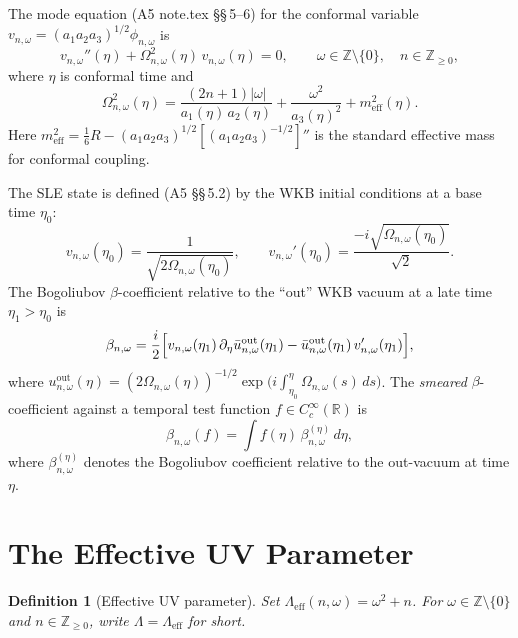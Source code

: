 \documentclass[11pt, a4paper]{article}
\newtheorem{definition}[theorem]{Definition}
\newcommand{\RR}{\mathbb{R}}
\newcommand{\ZZ}{\mathbb{Z}}
\newcommand{\om}{\omega}
\newcommand{\sixth}{\tfrac{1}{6}}
\newcommand{\Lam}{\Lambda}
\begin{document}
The mode equation (A5 note.tex \S\S\,5--6) for the conformal variable
$v_{n,\om} = (a_1 a_2 a_3)^{1/2} \phi_{n,\om}$ is
\begin{equation}\label{eq:mode}
  v_{n,\om}''(\eta) + \Omega_{n,\om}^2(\eta)\,v_{n,\om}(\eta) = 0,
  \qquad \om \in \ZZ \setminus \{0\},\quad n \in \ZZ_{\geq 0},
\end{equation}
where $\eta$ is conformal time and
\begin{equation}\label{eq:Omega}
  \Omega_{n,\om}^2(\eta)
  = \frac{(2n+1)|\om|}{a_1(\eta)\,a_2(\eta)}
    + \frac{\om^2}{a_3(\eta)^2}
    + m_{\mathrm{eff}}^2(\eta).
\end{equation}
Here $m_{\mathrm{eff}}^2 = \sixth R - (a_1 a_2 a_3)^{1/2}[(a_1 a_2 a_3)^{-1/2}]''$
is the standard effective mass for conformal coupling.

The SLE state is defined (A5 \S\S\,5.2) by the WKB initial conditions
at a base time $\eta_0$:
\begin{equation}\label{eq:WKB_IC}
  v_{n,\om}(\eta_0) = \frac{1}{\sqrt{2\Omega_{n,\om}(\eta_0)}},
  \qquad
  v_{n,\om}'(\eta_0) = \frac{-i\sqrt{\Omega_{n,\om}(\eta_0)}}{\sqrt{2}}.
\end{equation}
The Bogoliubov $\beta$-coefficient relative to the ``out'' WKB vacuum at
a late time $\eta_1 > \eta_0$ is
\begin{equation}\label{eq:beta_def}
  \beta_{n,\om} = \frac{i}{2}\Bigl[
    v_{n,\om}(\eta_1)\,\partial_\eta \bar{u}^{\mathrm{out}}_{n,\om}(\eta_1)
    - \bar{u}^{\mathrm{out}}_{n,\om}(\eta_1)\,v_{n,\om}'(\eta_1)
  \Bigr],
\end{equation}
where $u^{\mathrm{out}}_{n,\om}(\eta) =
(2\Omega_{n,\om}(\eta))^{-1/2}\exp\bigl(i\!\int_{\eta_0}^{\eta}
\Omega_{n,\om}(s)\,ds\bigr)$.
The \emph{smeared} $\beta$-coefficient against a temporal test function
$f \in C_c^\infty(\RR)$ is
\begin{equation}
  \beta_{n,\om}(f)
  = \int f(\eta)\,\beta_{n,\om}^{(\eta)}\,d\eta,
\end{equation}
where $\beta_{n,\om}^{(\eta)}$ denotes the Bogoliubov coefficient
relative to the out-vacuum at time $\eta$.

\section{The Effective UV Parameter}

\begin{definition}[Effective UV parameter]\label{def:Lambda}
  Set $\Lam_{\mathrm{eff}}(n, \om) = \om^2 + n$.
  For $\om \in \ZZ \setminus \{0\}$ and $n \in \ZZ_{\geq 0}$,
  write $\Lam = \Lam_{\mathrm{eff}}$ for short.
\end{definition}
\end{document}
